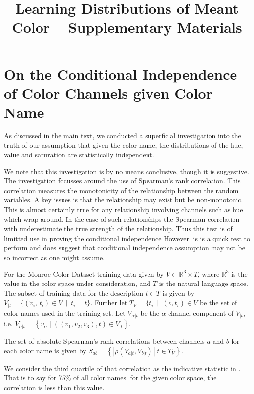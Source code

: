 \documentclass[11pt,letterpaper]{article}
\title{Learning Distributions of Meant Color -- Supplementary Materials}
\author{}
\date{}
\begin{document}
\maketitle

\section{On the Conditional Independence of Color Channels given Color Name}

As discussed in the main text, we conducted a superficial investigation into the truth of our assumption that given the color name, the distributions of the hue, value and saturation are statistically independent.

We note that this investigation is by no means conclusive, though it is suggestive.
The investigation focusses around the use of Spearman's rank correlation.
This correlation measures the monotonicity of the relationship between the random variables.
A key issues is that the relationship may exist but be non-monotonic.
This is almost certainly true for any relationship involving channels such as hue which wrap around.
In the case of such relationships the Spearman correlation with underestimate the true strength of the relationship.
Thus this test is of limitted use in proving the conditional independence
However, is is a quick test to perform and does suggest that conditional independence assumption may not be so incorrect as one might assume.


For the Monroe Color Dataset training data  given by $V \subset \mathbb{R}^{3}\times T$, where $\mathbb{R}^{3}$ is the value in the color space under consideration, and $T$ is the natural language space.
The subset of training data for the description $t \in T$ is given by
$V_{|t}=\{(\tilde{v}_i,\,t_i) \in V \: \mid \: t_{i}=t\}$.
Further let $T_V = \{t_i \: \mid \: (\tilde{v},t_i)\in V$ be the set of color names used in the training set.
Let $V_{\alpha|t}$ be the $\alpha$ channel component of $V_{|t}$, i.e. $V_{\alpha|t} = \left\lbrace v_\alpha \mid ((v_1,v_2,v_3), t) \in V_{|t} \right\rbrace$.

The set of absolute Spearman's rank correlations between channels $a$ and $b$ for each color name is given by
$S_{ab}=\left\lbrace \left|\rho(V_{a|t},V_{b|t})\,\right|\,t\in T_{V}\right\rbrace$.

We consider the third quartile of that correlation as the indicative statistic in .
That is to say for 75\% of all color names, for the given color space, the correlation is less than this value.
\end{document}
